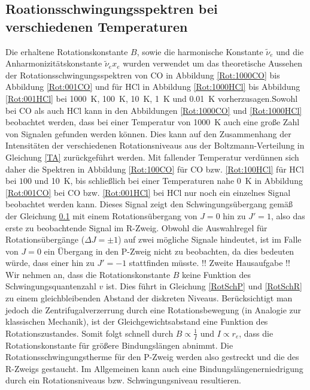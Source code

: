 \subsection{Roationsschwingungsspektren bei verschiedenen Temperaturen}


Die erhaltene Rotationskonstante $B$, sowie die harmonische Konstante $\tilde{\nu}_e$ und die Anharmonizitätskonstante $\tilde{\nu}_e x_e$ wurden verwendet um das theoretische Aussehen der Rotationsschwingungsspektren von CO in Abbildung \ref{Rot:1000CO} bis Abbildung \ref{Rot:001CO} und für HCl in Abbildung \ref{Rot:1000HCl} bis Abbildung \ref{Rot:001HCl} bei \SI[mode=math]{1000}{K}, \SI[mode=math]{100}{K}, \SI[mode=math]{10}{K}, \SI[mode=math]{1}{K} und \SI[mode=math]{0.01}{K} vorherzusagen.Sowohl bei CO als auch HCl kann in den Abbildungen \ref{Rot:1000CO} und \ref{Rot:1000HCl} beobachtet werden, dass bei einer Temperatur von \SI[mode=math]{1000}{K} auch eine große Zahl von Signalen gefunden werden können. Dies kann auf den Zusammenhang der Intensitäten der verschiedenen Rotationsniveaus aus der Boltzmann-Verteilung in Gleichung \ref{TA} zurückgeführt werden. Mit fallender Temperatur verdünnen sich daher die Spektren in Abbildung \ref{Rot:100CO} für CO bzw. \ref{Rot:100HCl} für HCl bei $100$ und \SI[mode=math]{10}{K}, bis schließlich bei einer Temperaturen nahe \SI[mode=math]{0}{K} in Abbildung \ref{Rot:001CO} bei CO bzw. \ref{Rot:001HCl} bei HCl nur noch ein einzelnes Signal beobachtet werden kann. Dieses Signal zeigt den Schwingungsübergang gemäß der Gleichung \ref{}  mit einem Rotationsübergang von $J=0$ hin zu $J'=1$, also das erste zu beobachtende Signal im R-Zweig. Obwohl die Auswahlregel für Rotationsübergänge (\(\Delta J = \pm 1\)) auf zwei mögliche Signale hindeutet, ist im Falle von $J=0$ ein Übergang in den P-Zweig nicht zu beobachten, da dies bedeuten würde, dass einer  hin zu $J'=-1$ stattfinden müsste. !! Zweite Hausaufgabe !!\\
Wir nehmen an, dass die Rotationskonstante $B$ keine Funktion des Schwingungsquantenzahl $v$ ist. Dies führt in Gleichung \ref{RotSchP} und \ref{RotSchR} zu einem gleichbleibenden Abstand der diskreten Niveaus. Berücksichtigt man jedoch die Zentrifugalverzerrung durch eine Rotationsbewegung (in Analogie zur klassischen Mechanik), ist der Gleichgewichtsabstand eine Funktion des Rotationszustandes. Somit folgt schnell durch $B \propto \frac{1}{I}$ und $I \propto r_e$, dass die Rotationskonstante für größere Bindungslängen abnimmt. Die Rotationsschwingungstherme für den P-Zweig werden also gestreckt und die des R-Zweigs gestaucht. Im Allgemeinen kann auch eine Bindungslängenerniedrigung durch ein Rotationsniveaus bzw. Schwingungsniveau resultieren.

